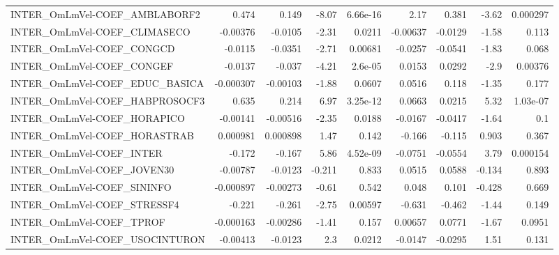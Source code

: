 \begin{tabular}{lrrrrrrrr}
INTER\_OmLmVel-COEF\_AMBLABORF2          &       0.474 &        0.149 &    -8.07 & 6.66e-16 &       2.17 &       0.381 &        -3.62 &      0.000297 \\
INTER\_OmLmVel-COEF\_CLIMASECO           &    -0.00376 &      -0.0105 &    -2.31 &   0.0211 &   -0.00637 &     -0.0129 &        -1.58 &         0.113 \\
INTER\_OmLmVel-COEF\_CONGCD              &     -0.0115 &      -0.0351 &    -2.71 &  0.00681 &    -0.0257 &     -0.0541 &        -1.83 &         0.068 \\
INTER\_OmLmVel-COEF\_CONGEF              &     -0.0137 &       -0.037 &    -4.21 &  2.6e-05 &     0.0153 &      0.0292 &         -2.9 &       0.00376 \\
INTER\_OmLmVel-COEF\_EDUC\_BASICA         &   -0.000307 &     -0.00103 &    -1.88 &   0.0607 &     0.0516 &       0.118 &        -1.35 &         0.177 \\
INTER\_OmLmVel-COEF\_HABPROSOCF3         &       0.635 &        0.214 &     6.97 & 3.25e-12 &     0.0663 &      0.0215 &         5.32 &      1.03e-07 \\
INTER\_OmLmVel-COEF\_HORAPICO            &    -0.00141 &     -0.00516 &    -2.35 &   0.0188 &    -0.0167 &     -0.0417 &        -1.64 &           0.1 \\
INTER\_OmLmVel-COEF\_HORASTRAB           &    0.000981 &     0.000898 &     1.47 &    0.142 &     -0.166 &      -0.115 &        0.903 &         0.367 \\
INTER\_OmLmVel-COEF\_INTER               &      -0.172 &       -0.167 &     5.86 & 4.52e-09 &    -0.0751 &     -0.0554 &         3.79 &      0.000154 \\
INTER\_OmLmVel-COEF\_JOVEN30             &    -0.00787 &      -0.0123 &   -0.211 &    0.833 &     0.0515 &      0.0588 &       -0.134 &         0.893 \\
INTER\_OmLmVel-COEF\_SININFO             &   -0.000897 &     -0.00273 &    -0.61 &    0.542 &      0.048 &       0.101 &       -0.428 &         0.669 \\
INTER\_OmLmVel-COEF\_STRESSF4            &      -0.221 &       -0.261 &    -2.75 &  0.00597 &     -0.631 &      -0.462 &        -1.44 &         0.149 \\
INTER\_OmLmVel-COEF\_TPROF               &   -0.000163 &     -0.00286 &    -1.41 &    0.157 &    0.00657 &      0.0771 &        -1.67 &        0.0951 \\
INTER\_OmLmVel-COEF\_USOCINTURON         &    -0.00413 &      -0.0123 &      2.3 &   0.0212 &    -0.0147 &     -0.0295 &         1.51 &         0.131 \\

\end{tabular}
